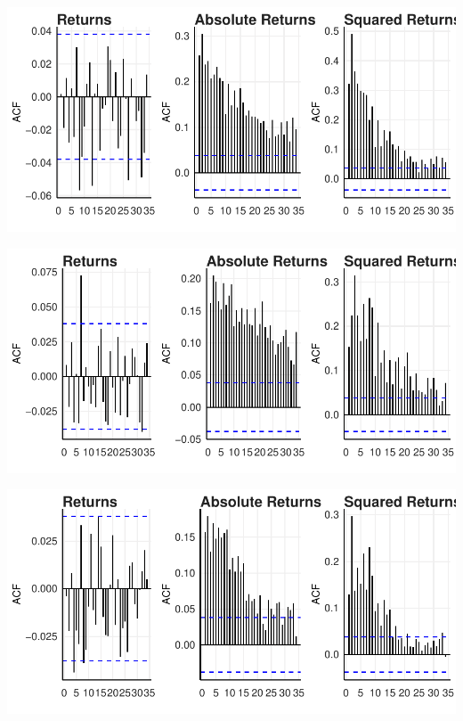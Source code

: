 \documentclass[12pt,preprint, authoryear]{elsarticle}
\let\origfigure\figure
\let\endorigfigure\endfigure
\renewenvironment{figure}[1][2] {
    \expandafter\origfigure\expandafter[H]
} {
    \endorigfigure
}
\numberwithin{equation}{section}
\numberwithin{figure}{section}
\numberwithin{table}{section}
\begin{document}
\begin{figure}[H]

{\centering \includegraphics{WriteUp_files/figure-latex/FigureA4-1} 

}

\caption{Autocorrelation Functions: Financials \label{FigureA4}}\label{fig:FigureA4}
\end{figure}

\begin{figure}[H]

{\centering \includegraphics{WriteUp_files/figure-latex/FigureA5-1} 

}

\caption{Autocorrelation Functions: Resources \label{FigureA5}}\label{fig:FigureA5}
\end{figure}

\begin{figure}[H]

{\centering \includegraphics{WriteUp_files/figure-latex/FigureA6-1} 

}

\caption{Autocorrelation Functions: Industrials \label{FigureA6}}\label{fig:FigureA6}
\end{figure}


\end{document}
